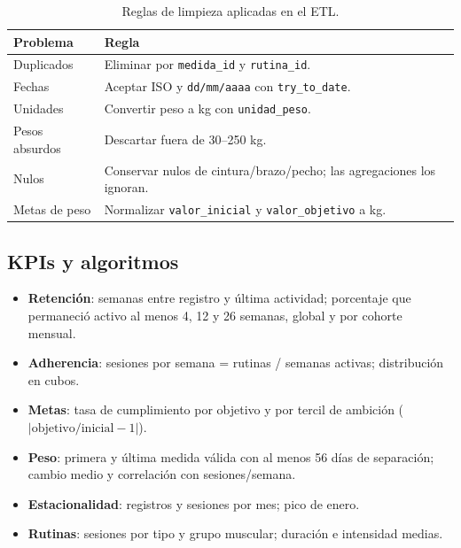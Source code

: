 \documentclass[conference]{IEEEtran}
\begin{document}
\begin{table}[t]
\centering
\caption{Reglas de limpieza aplicadas en el ETL.}
\label{tab:limpieza-reglas}
\small
\begin{tabularx}{\columnwidth}{@{}l Y@{}}
\toprule
Problema & Regla \\
\midrule
Duplicados & Eliminar por \texttt{medida\_id} y \texttt{rutina\_id}. \\
Fechas & Aceptar ISO y \texttt{dd/mm/aaaa} con \texttt{try\_to\_date}. \\
Unidades & Convertir peso a kg con \texttt{unidad\_peso}. \\
Pesos absurdos & Descartar fuera de 30--250 kg. \\
Nulos & Conservar nulos de cintura/brazo/pecho; las agregaciones los ignoran. \\
Metas de peso & Normalizar \texttt{valor\_inicial} y \texttt{valor\_objetivo} a kg. \\
\bottomrule
\end{tabularx}
\end{table}

\subsection{KPIs y algoritmos}
\begin{itemize}
\item \textbf{Retención}: semanas entre registro y última actividad; porcentaje que permaneció activo
al menos 4, 12 y 26 semanas, global y por cohorte mensual.
\item \textbf{Adherencia}: sesiones por semana = rutinas / semanas activas; distribución en cubos.
\item \textbf{Metas}: tasa de cumplimiento por objetivo y por tercil de ambición
($|\text{objetivo}/\text{inicial} - 1|$).
\item \textbf{Peso}: primera y última medida válida con al menos 56 días de separación; cambio medio
y correlación con sesiones/semana.
\item \textbf{Estacionalidad}: registros y sesiones por mes; pico de enero.
\item \textbf{Rutinas}: sesiones por tipo y grupo muscular; duración e intensidad medias.
\end{itemize}
\end{document}
